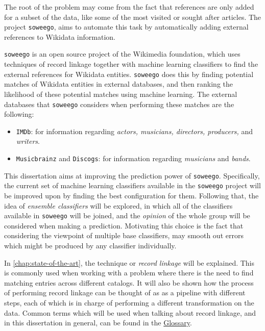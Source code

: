\documentclass[epsfig,a4paper,11pt,titlepage,twoside,openany]{book}
\newcommand{\soweego}[0]{\texttt{soweego}\xspace}
\begin{document}
The root of the problem may come from the fact that references are only added for a subset of the data, like some of the most visited or sought after articles. The project \soweego, aims to automate this task by automatically adding external references to Wikidata information. 

\soweego is an open source project of the Wikimedia foundation, which uses techniques of record linkage together with machine learning classifiers to find the external references for Wikidata entities. \soweego does this by finding potential matches of Wikidata entities in external databases, and then ranking the likelihood of these potential matches using machine learning. The external databases that \soweego considers when performing these matches are the following:

\begin{itemize}
    \item \texttt{IMDb}: for information regarding \textit{actors, musicians, directors, producers,} and \textit{writers}.
    \item \texttt{Musicbrainz} and \texttt{Discogs}: for information regarding \textit{musicians} and \textit{bands}.
\end{itemize}

This dissertation aims at improving the prediction power of \soweego. Specifically, the current set of machine learning classifiers available in the \soweego project will be improved upon by finding the best configuration for them. Following that, the idea of \textit{ensemble classifiers} will be explored, in which all of the classifiers available in \soweego will be joined, and the \textit{opinion} of the whole group will be considered when making a prediction. Motivating this choice is the fact that considering the viewpoint of multiple base classifiers, may smooth out errors which might be produced by any classifier individually. 

In \autoref{chap:state-of-the-art}, the technique or \textit{record linkage} will be explained. This is commonly used when working with a problem where there is the need to find matching entries across different catalogs. It will also be shown how the process of performing record linkage can be thought of as as a pipeline with different steps, each of which is in charge of performing a different transformation on the data. Common terms which will be used when talking about record linkage, and in this dissertation in general, can be found in the \hyperref[sec:apx-glossary]{Glossary}.
\end{document}
